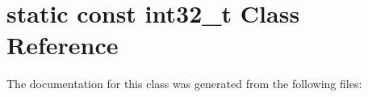 \hypertarget{classstatic_01const_01int32__t}{}\section{static const int32\+\_\+t Class Reference}
\label{classstatic_01const_01int32__t}


The documentation for this class was generated from the following files\+: